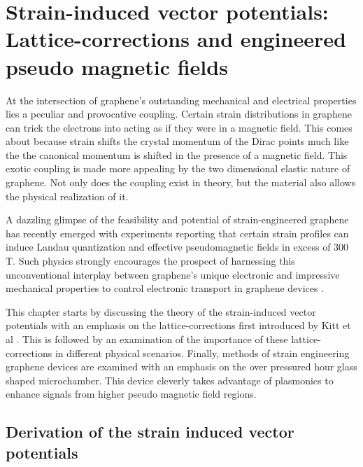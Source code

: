 \chapter{Strain-induced vector potentials: Lattice-corrections and engineered pseudo magnetic fields\label{chap:PVP}}

At the intersection of graphene's outstanding mechanical and electrical properties lies a peculiar and provocative coupling.
Certain strain distributions in graphene can trick the electrons into acting as if they were in a magnetic field.
This comes about because strain shifts the crystal momentum of the Dirac points much like the the canonical momentum is shifted in the presence of a magnetic field.
This exotic coupling is made more appealing by the two dimensional elastic nature of graphene.
Not only does the coupling exist in theory, but the material also allows the physical realization of it.

A dazzling glimpse of the feasibility and potential of strain-engineered graphene \cite{Pereira2009a,Guinea2009} has recently emerged with experiments reporting that certain strain profiles can induce Landau quantization and effective pseudomagnetic fields in excess of 300 T\cite{Levy2010,Yan2012,Yeh2011}.
Such physics strongly encourages the prospect of harnessing this unconventional interplay between graphene's unique electronic and impressive mechanical properties to control electronic transport in graphene devices \cite{Pereira2009a,Fogler2008}.

This chapter starts by discussing the theory of the strain-induced vector potentials with an emphasis on the lattice-corrections first introduced by Kitt et al \cite{Kitt2012,Kitt2013}.
This is followed by an examination of the importance of these lattice-corrections in different physical scenarios.
Finally, methods of strain engineering graphene devices are examined with an emphasis on the over pressured hour glass shaped microchamber.
This device cleverly takes advantage of plasmonics to enhance signals from higher pseudo magnetic field regions.

\section{Derivation of the strain induced vector potentials}


